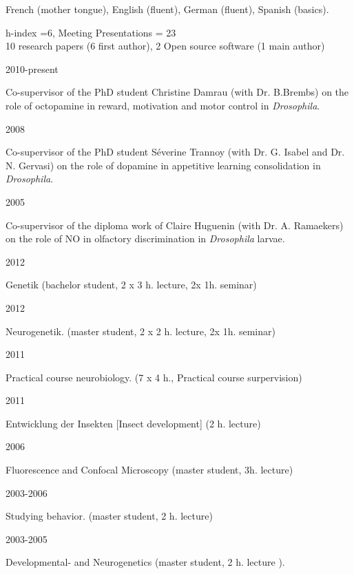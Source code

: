  French (mother tongue), English (fluent),
German (fluent), Spanish (basics).

%
h-index =6,
Meeting Presentations = 23
\\
10 research papers (6 first author), 2 Open source software (1 main author)


\parbox{0.15\textwidth}{2010-present}\hfill
	\parbox[t]{0.83\textwidth}{Co-supervisor of the PhD student Christine Damrau
(with Dr. B.Brembs) on the role of octopamine in reward, motivation and motor control in  \textit{Drosophila}.}
\parbox{0.15\textwidth}{2008}\hfill
	\parbox[t]{0.83\textwidth}{Co-supervisor of the PhD student S\'everine Trannoy
(with Dr. G. Isabel and Dr. N. Gervasi) on the role of dopamine in appetitive learning consolidation in  \textit{Drosophila}.}
\parbox{0.15\textwidth}{2005}\hfill
\parbox[t]{0.83\textwidth}{Co-supervisor of the diploma work of Claire Huguenin
(with Dr. A. Ramaekers) on the role of NO in olfactory discrimination in \textit{Drosophila} larvae.}





\parbox{0.15\textwidth}{2012}\hfill
\parbox[t]{0.83\textwidth}{Genetik (bachelor student, 2 x 3 h. lecture, 2x 1h. seminar)}
\parbox{0.15\textwidth}{2012}\hfill
\parbox[t]{0.83\textwidth}{Neurogenetik. (master student, 2 x 2 h. lecture, 2x 1h. seminar)}

\parbox{0.15\textwidth}{2011}\hfill
\parbox[t]{0.83\textwidth}{Practical course neurobiology. (7 x 4 h., Practical course surpervision)}
\parbox{0.15\textwidth}{2011}\hfill
\parbox[t]{0.83\textwidth}{Entwicklung der Insekten [Insect development] (2 h. lecture)}
 
\parbox{0.15\textwidth}{2006}\hfill
\parbox[t]{0.83\textwidth}{Fluorescence and Confocal Microscopy (master student, 3h. lecture)}
\parbox{0.15\textwidth}{2003-2006}\hfill
\parbox[t]{0.83\textwidth}{Studying behavior. (master student, 2 h. lecture)}
\parbox{0.15\textwidth}{2003-2005}\hfill
\parbox[t]{0.83\textwidth}{Developmental- and Neurogenetics %
(master student, 2 h. lecture%
).}



